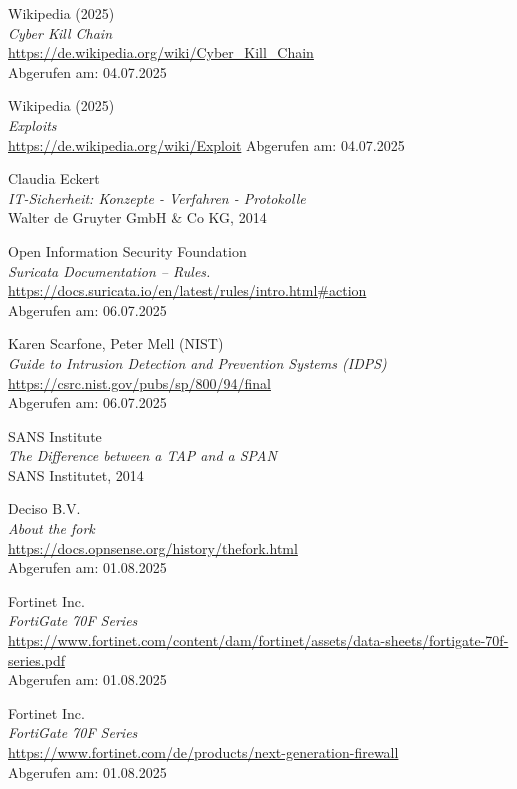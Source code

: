 \documentclass[12pt]{scrreprt}
\begin{document}
\begin{thebibliography}{99}
Wikipedia (2025)\\
\emph{Cyber Kill Chain} \\
\url{https://de.wikipedia.org/wiki/Cyber_Kill_Chain}\\
Abgerufen am: 04.07.2025

Wikipedia (2025)\\
\emph{Exploits} \\
\url{https://de.wikipedia.org/wiki/Exploit}
Abgerufen am: 04.07.2025

Claudia Eckert\\
\emph{IT-Sicherheit: Konzepte - Verfahren - Protokolle} \\
Walter de Gruyter GmbH \& Co KG, 2014

Open Information Security Foundation\\
\emph{Suricata Documentation – Rules.} \\
\url{https://docs.suricata.io/en/latest/rules/intro.html#action}\\
Abgerufen am: 06.07.2025

Karen Scarfone, Peter Mell (NIST)\\
\emph{Guide to Intrusion Detection and Prevention Systems (IDPS)} \\
\url{https://csrc.nist.gov/pubs/sp/800/94/final}\\
Abgerufen am: 06.07.2025

SANS Institute\\
\emph{The Difference between a TAP and a SPAN} \\
SANS Institutet, 2014 

Deciso B.V.\\
\emph{About the fork} \\
\url{https://docs.opnsense.org/history/thefork.html}\\
Abgerufen am: 01.08.2025

Fortinet Inc.\\
\emph{FortiGate 70F Series} \\
\url{https://www.fortinet.com/content/dam/fortinet/assets/data-sheets/fortigate-70f-series.pdf}\\
Abgerufen am: 01.08.2025

Fortinet Inc.\\
\emph{FortiGate 70F Series} \\
\url{https://www.fortinet.com/de/products/next-generation-firewall}\\
Abgerufen am: 01.08.2025



\end{thebibliography}
\end{document}
